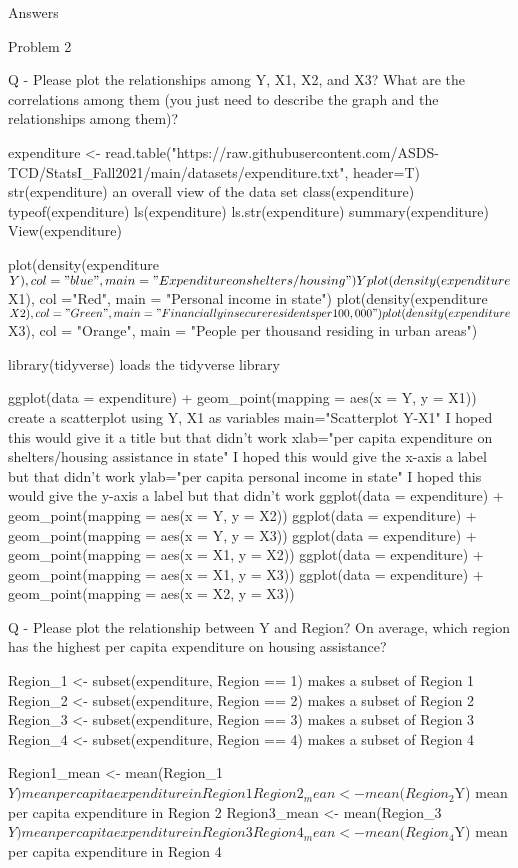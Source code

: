 \documentclass[12pt,letterpaper]{article}
\begin{document}
Answers

Problem 2

Q - Please plot the relationships among Y, X1, X2, and X3? What are the correlations among them (you just need to describe the graph and the relationships among them)?

expenditure <- read.table("https://raw.githubusercontent.com/ASDS-TCD/StatsI_Fall2021/main/datasets/expenditure.txt", header=T)
str(expenditure)  an overall view of the data set
class(expenditure)
typeof(expenditure)
ls(expenditure)
ls.str(expenditure)
summary(expenditure)
View(expenditure)

plot(density(expenditure$Y), col = "blue", main = "Expenditure on shelters/housing")
Yplot(density(expenditure$X1), col ="Red", main = "Personal income in state")
plot(density(expenditure$X2), col = "Green", main = "Financially insecure residents per 100,000")
plot(density(expenditure$X3), col = "Orange", main = "People per thousand residing in urban areas")

library(tidyverse) loads the tidyverse library

ggplot(data = expenditure) + geom_point(mapping = aes(x = Y, y = X1)) create a scatterplot using Y, X1 as variables
 main="Scatterplot Y-X1"  I hoped this would give it a title but that didn't work
xlab="per capita expenditure on shelters/housing assistance in state" I hoped this would give the x-axis a label but that didn't work
ylab="per capita personal income in state" I hoped this would give the y-axis a label but that didn't work
ggplot(data = expenditure) + geom_point(mapping = aes(x = Y, y = X2)) 
ggplot(data = expenditure) + geom_point(mapping = aes(x = Y, y = X3)) 
ggplot(data = expenditure) + geom_point(mapping = aes(x = X1, y = X2))
ggplot(data = expenditure) + geom_point(mapping = aes(x = X1, y = X3))
ggplot(data = expenditure) + geom_point(mapping = aes(x = X2, y = X3)) 

Q - Please plot the relationship between Y and Region? On average, which region has the highest per capita expenditure on housing assistance?

Region_1 <- subset(expenditure, Region == 1) makes a subset of Region 1
Region_2 <- subset(expenditure, Region == 2) makes a subset of Region 2
Region_3 <- subset(expenditure, Region == 3) makes a subset of Region 3
Region_4 <- subset(expenditure, Region == 4) makes a subset of Region 4

Region1_mean <- mean(Region_1$Y) mean per capita expenditure in Region 1
Region2_mean <- mean(Region_2$Y) mean per capita expenditure in Region 2
Region3_mean <- mean(Region_3$Y) mean per capita expenditure in Region 3
Region4_mean <- mean(Region_4$Y) mean per capita expenditure in Region 4
\end{document}
